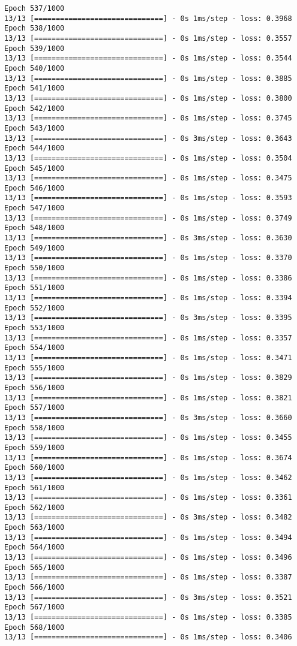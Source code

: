 \documentclass[11pt]{article}
\begin{document}
\begin{Verbatim}[commandchars=\\\{\}]
Epoch 537/1000
13/13 [==============================] - 0s 1ms/step - loss: 0.3968
Epoch 538/1000
13/13 [==============================] - 0s 1ms/step - loss: 0.3557
Epoch 539/1000
13/13 [==============================] - 0s 1ms/step - loss: 0.3544
Epoch 540/1000
13/13 [==============================] - 0s 1ms/step - loss: 0.3885
Epoch 541/1000
13/13 [==============================] - 0s 1ms/step - loss: 0.3800
Epoch 542/1000
13/13 [==============================] - 0s 1ms/step - loss: 0.3745
Epoch 543/1000
13/13 [==============================] - 0s 3ms/step - loss: 0.3643
Epoch 544/1000
13/13 [==============================] - 0s 1ms/step - loss: 0.3504
Epoch 545/1000
13/13 [==============================] - 0s 1ms/step - loss: 0.3475
Epoch 546/1000
13/13 [==============================] - 0s 1ms/step - loss: 0.3593
Epoch 547/1000
13/13 [==============================] - 0s 1ms/step - loss: 0.3749
Epoch 548/1000
13/13 [==============================] - 0s 3ms/step - loss: 0.3630
Epoch 549/1000
13/13 [==============================] - 0s 1ms/step - loss: 0.3370
Epoch 550/1000
13/13 [==============================] - 0s 1ms/step - loss: 0.3386
Epoch 551/1000
13/13 [==============================] - 0s 1ms/step - loss: 0.3394
Epoch 552/1000
13/13 [==============================] - 0s 3ms/step - loss: 0.3395
Epoch 553/1000
13/13 [==============================] - 0s 1ms/step - loss: 0.3357
Epoch 554/1000
13/13 [==============================] - 0s 1ms/step - loss: 0.3471
Epoch 555/1000
13/13 [==============================] - 0s 1ms/step - loss: 0.3829
Epoch 556/1000
13/13 [==============================] - 0s 1ms/step - loss: 0.3821
Epoch 557/1000
13/13 [==============================] - 0s 3ms/step - loss: 0.3660
Epoch 558/1000
13/13 [==============================] - 0s 1ms/step - loss: 0.3455
Epoch 559/1000
13/13 [==============================] - 0s 1ms/step - loss: 0.3674
Epoch 560/1000
13/13 [==============================] - 0s 1ms/step - loss: 0.3462
Epoch 561/1000
13/13 [==============================] - 0s 1ms/step - loss: 0.3361
Epoch 562/1000
13/13 [==============================] - 0s 3ms/step - loss: 0.3482
Epoch 563/1000
13/13 [==============================] - 0s 1ms/step - loss: 0.3494
Epoch 564/1000
13/13 [==============================] - 0s 1ms/step - loss: 0.3496
Epoch 565/1000
13/13 [==============================] - 0s 1ms/step - loss: 0.3387
Epoch 566/1000
13/13 [==============================] - 0s 3ms/step - loss: 0.3521
Epoch 567/1000
13/13 [==============================] - 0s 1ms/step - loss: 0.3385
Epoch 568/1000
13/13 [==============================] - 0s 1ms/step - loss: 0.3406

\end{Verbatim}
\end{document}
